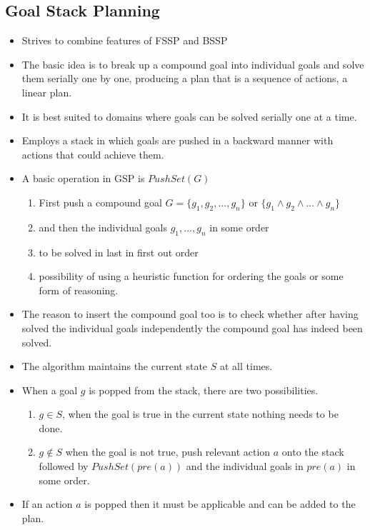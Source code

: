 \documentclass[a4paper]{article}
\begin{document}
\subsection{Goal Stack Planning}
\begin{itemize}
    \item Strives to combine features of FSSP and BSSP
    \item The basic idea is to break up a compound goal into individual goals and solve them serially one by one, producing a plan that is a sequence of actions, a linear plan.
    \item It is best suited to domains where goals can be solved serially one at a time.
    \item Employs a stack in which goals are pushed in a backward manner with actions that could achieve them.
    \item A basic operation in GSP is $PushSet(G)$
    \begin{enumerate}
        \item First push a compound goal $G=\{g_1,g_2,...,g_n\}$ or $\{g_1\land g_2\land ...\land g_n\}$
        \item and then the individual goals $g_1,...,g_n$ in some order
        \item to be solved in last in first out order
        \item possibility of using a heuristic function for ordering the goals or some form of reasoning.
    \end{enumerate}
    \item The reason to insert the compound goal too is to check whether after having solved the individual goals independently the compound goal has indeed been solved.
    \item The algorithm maintains the current state $S$ at all times.
    \item When a goal $g$ is popped from the stack, there are two possibilities.
    \begin{enumerate}
        \item $g\in S$, when the goal is true in the current state nothing needs to be done.
        \item $g\notin S$ when the goal is not true, push relevant action $a$ onto the stack followed by $PushSet(pre(a))$ and the individual goals in $pre(a)$ in some order.
    \end{enumerate}
    \item If an action $a$ is popped then it must be applicable and can be added to the plan.
    \begin{algorithm}[H]

\end{algorithm}
\end{itemize}
\end{document}
